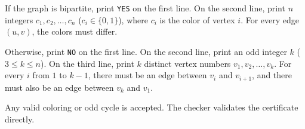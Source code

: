 If the graph is bipartite, print \texttt{YES} on the first line. On the second line, print $n$ integers $c_1,c_2,\ldots,c_n$ ($c_i\in\{0,1\}$), where $c_i$ is the color of vertex $i$. For every edge $(u,v)$, the colors must differ.

Otherwise, print \texttt{NO} on the first line. On the second line, print an odd integer $k$ ($3\le k\le n$). On the third line, print $k$ distinct vertex numbers $v_1,v_2,\ldots,v_k$. For every $i$ from $1$ to $k-1$, there must be an edge between $v_i$ and $v_{i+1}$, and there must also be an edge between $v_k$ and $v_1$.

Any valid coloring or odd cycle is accepted. The checker validates the certificate directly.
